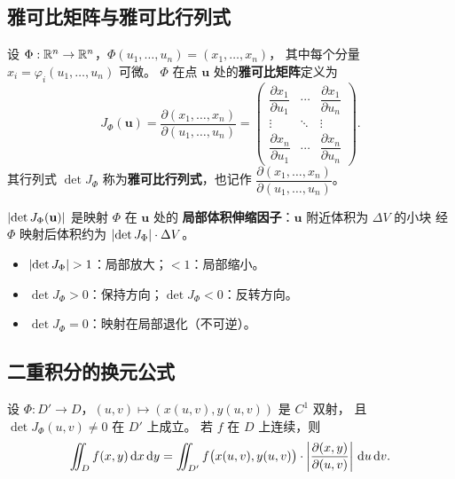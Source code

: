 \documentclass{ctexart}
\begin{document}
\subsection{雅可比矩阵与雅可比行列式}

\begin{definition}[雅可比矩阵]
  设 $\Phi: \mathbb{R}^n \to \mathbb{R}^n$，$\Phi(u_1, \ldots, u_n) = (x_1, \ldots, x_n)$，
  其中每个分量 $x_i = \varphi_i(u_1, \ldots, u_n)$ 可微。
  $\Phi$ 在点 $\mathbf{u}$ 处的\textbf{雅可比矩阵}定义为
  \[
    J_\Phi(\mathbf{u})
    = \frac{\partial(x_1, \ldots, x_n)}{\partial(u_1, \ldots, u_n)}
    = \begin{pmatrix}
        \dfrac{\partial x_1}{\partial u_1} & \cdots & \dfrac{\partial x_1}{\partial u_n} \\[8pt]
        \vdots & \ddots & \vdots \\[4pt]
        \dfrac{\partial x_n}{\partial u_1} & \cdots & \dfrac{\partial x_n}{\partial u_n}
      \end{pmatrix}.
  \]
  其行列式 $\det J_\Phi$ 称为\textbf{雅可比行列式}，也记作
  $\dfrac{\partial(x_1, \ldots, x_n)}{\partial(u_1, \ldots, u_n)}$。
\end{definition}

\begin{remark}[雅可比行列式的几何意义]
  $\left| \det J_\Phi(\mathbf{u}) \right|$ 是映射 $\Phi$ 在 $\mathbf{u}$ 处的
  \textbf{局部体积伸缩因子}：$\mathbf{u}$ 附近体积为 $\Delta V$ 的小块
  经 $\Phi$ 映射后体积约为 $\left| \det J_\Phi \right| \cdot \Delta V$。
  \begin{itemize}
    \item $\left| \det J_\Phi \right| > 1$：局部放大；$< 1$：局部缩小。
    \item $\det J_\Phi > 0$：保持方向；$\det J_\Phi < 0$：反转方向。
    \item $\det J_\Phi = 0$：映射在局部退化（不可逆）。
  \end{itemize}
\end{remark}

\subsection{二重积分的换元公式}

\begin{theorem}[二重积分换元公式]
  设 $\Phi: D' \to D$，$(u,v) \mapsto (x(u,v), y(u,v))$ 是 $C^1$ 双射，
  且 $\det J_\Phi(u,v) \ne 0$ 在 $D'$ 上成立。
  若 $f$ 在 $D$ 上连续，则
  \[
    \iint_D f(x,y) \,\mathrm{d} x\,\mathrm{d} y
    = \iint_{D'} f\bigl(x(u,v), y(u,v)\bigr) \cdot
      \left| \frac{\partial(x,y)}{\partial(u,v)} \right| \,\mathrm{d} u\,\mathrm{d} v.
  \]
\end{theorem}
\end{document}
